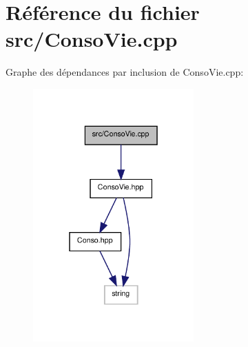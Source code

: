 \section{Référence du fichier src/\-Conso\-Vie.cpp}
\label{_conso_vie_8cpp}
Graphe des dépendances par inclusion de Conso\-Vie.\-cpp\-:\nopagebreak
\begin{figure}[H]
\begin{center}
\leavevmode
\includegraphics[width=175pt]{_conso_vie_8cpp__incl}
\end{center}
\end{figure}
